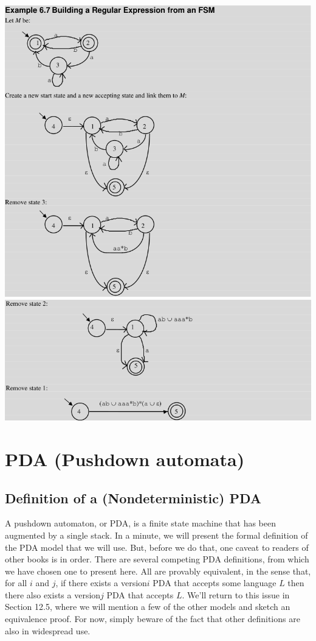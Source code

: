 \documentclass[hidelinks,12pt]{article}
\begin{document}
\includegraphics[width=\textwidth]{img/fsmtoregex1.png}
\includegraphics[width=\textwidth]{img/fsmtoregex2.png}

\section{PDA (Pushdown automata)}

\subsection{Definition of a (Nondeterministic) PDA }

A pushdown automaton, or PDA, is a finite state machine that has been augmented
by a single stack. In a minute, we will present the formal definition of the
PDA model that we will use. But, before we do that, one caveat to readers of
other books is in order. There are several competing PDA definitions, from
which we have chosen one to present here. All are provably equivalent, in the
sense that, for all $i$ and $j$, if there exists a version$i$ PDA that accepts
some language $L$ then there also exists a version$j$ PDA that accepts $L$.
We’ll return to this issue in Section 12.5, where we will mention a few of the
other models and sketch an equivalence proof. For now, simply beware of the
fact that other definitions are also in widespread use.
\end{document}
